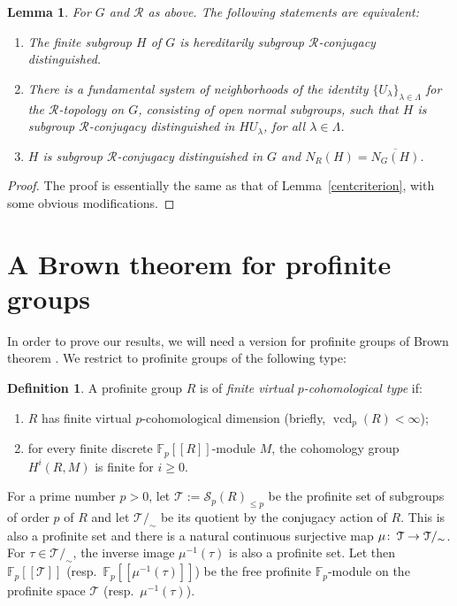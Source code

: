 \documentclass[12pt,twoside]{amsart}
\newcommand\F{{\mathbb F}}
\newcommand\cR{{\mathcal R}}
\newcommand\ol{\overline}
\newcommand\cS{{\mathscr S}}
\newcommand\cT{{\mathcal T}}
\newcommand\ld{\lambda}
\newcommand\Ld{\Lambda}
\def\co{\colon\thinspace}
\newcommand\vcd{\operatorname{vcd}}
\newtheorem{lemma}[theorem]{Lemma}
\theoremstyle{definition}
\newtheorem{definition}[theorem]{Definition}
\begin{document}
\begin{lemma}\label{normcriterion}For $G$ and $\cR$ as above. The following statements are equivalent:
\begin{enumerate}
\item The finite subgroup $H$ of $G$ is hereditarily subgroup $\cR$-conjugacy distinguished.
\item There is a fundamental system of neighborhoods of the identity $\{U_\ld\}_{\ld\in\Ld}$ for the $\cR$-topology on $G$, consisting 
of open normal subgroups, such that $H$ is subgroup $\cR$-conjugacy distinguished in $H U_\ld$, for all $\ld\in\Ld$.
\item $H$ is subgroup $\cR$-conjugacy distinguished in $G$ and $N_R(H)=\ol{N_G(H)}$.
\end{enumerate}
\end{lemma}

\begin{proof}The proof is essentially the same as that of Lemma~\ref{centcriterion}, with some obvious modifications.
\end{proof}






\section{A Brown theorem for profinite groups}\label{BrownSec}
In order to prove our results, we will need a version for profinite groups of Brown theorem \cite[Corollary~7.4 in Chapter~X]{Brown}. 
We restrict to profinite groups of the following type:

\begin{definition}\label{fctpro}A profinite group $R$ is of \emph{finite virtual $p$-cohomological type} if:
\begin{enumerate}
\item $R$ has finite virtual $p$-cohomological dimension (briefly, $\vcd_p(R)<\infty$);
\item for every finite discrete $\F_p[[R]]$-module $M$, the cohomology group $H^i(R,M)$ is finite for $i\geq 0$.
\end{enumerate}
\end{definition}

For a prime number $p>0$, let $\mathcal T:=\cS_p(R)_{\leq p}$ be the profinite set of subgroups of order $p$ of $R$ 
and let $\cT/_\sim$ be its quotient by the conjugacy action of $R$. This is also a profinite set and there is a natural continuous surjective map
$\mu\co\cT\to\cT/_\sim$. For $\tau\in\cT/_\sim$, the inverse image $\mu^{-1}(\tau)$ is also a profinite set.
Let then $\F_p[[\cT]]$ (resp.\ $\F_p[[\mu^{-1}(\tau)]]$) be the free profinite $\F_p$-module on the profinite space $\cT$ (resp.\ $\mu^{-1}(\tau)$). 
\end{document}
